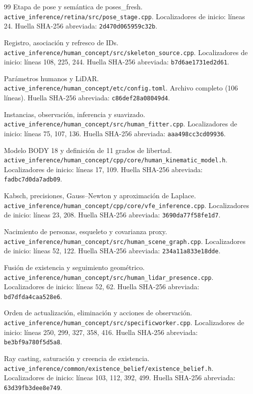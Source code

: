 \documentclass[11pt,a4paper]{article}
\newcommand{\code}[1]{\nolinkurl{#1}}
\newcommand{\file}[1]{\nolinkurl{#1}}
\begin{document}
\begin{thebibliography}{99}
 Etapa de pose y semántica de poses\_fresh.
\file{active_inference/retina/src/pose_stage.cpp}.
Localizadores de inicio: líneas 24. Huella SHA-256 abreviada: \code{2d470d065959c32b}.

 Registro, asociación y refresco de IDs.
\file{active_inference/human_concept/src/skeleton_source.cpp}.
Localizadores de inicio: líneas 108, 225, 244. Huella SHA-256 abreviada: \code{b7d6ae1731ed2d61}.

 Parámetros humanos y LiDAR.
\file{active_inference/human_concept/etc/config.toml}.
Archivo completo (106 líneas). Huella SHA-256 abreviada: \code{c86def28a08049d4}.

 Instancias, observación, inferencia y suavizado.
\file{active_inference/human_concept/src/human_fitter.cpp}.
Localizadores de inicio: líneas 75, 107, 136. Huella SHA-256 abreviada: \code{aaa498cc3cd09936}.

 Modelo BODY 18 y definición de 11 grados de libertad.
\file{active_inference/human_concept/cpp/core/human_kinematic_model.h}.
Localizadores de inicio: líneas 17, 109. Huella SHA-256 abreviada: \code{fadbc7d0da7adb09}.

 Kabsch, precisiones, Gauss--Newton y aproximación de Laplace.
\file{active_inference/human_concept/cpp/core/vfe_inference.cpp}.
Localizadores de inicio: líneas 23, 208. Huella SHA-256 abreviada: \code{3690da77f58fe1d7}.

 Nacimiento de personas, esqueleto y covarianza proxy.
\file{active_inference/human_concept/src/human_scene_graph.cpp}.
Localizadores de inicio: líneas 52, 122. Huella SHA-256 abreviada: \code{234a11a833e18dde}.

 Fusión de existencia y seguimiento geométrico.
\file{active_inference/human_concept/src/human_lidar_presence.cpp}.
Localizadores de inicio: líneas 52, 62. Huella SHA-256 abreviada: \code{bd7dfda4caa528e6}.

 Orden de actualización, eliminación y acciones de observación.
\file{active_inference/human_concept/src/specificworker.cpp}.
Localizadores de inicio: líneas 250, 299, 327, 358, 416. Huella SHA-256 abreviada: \code{be3bf9a780f5d5a8}.

 Ray casting, saturación y creencia de existencia.
\file{active_inference/common/existence_belief/existence_belief.h}.
Localizadores de inicio: líneas 103, 112, 392, 499. Huella SHA-256 abreviada: \code{63d39fb3dee8e749}.


\end{thebibliography}
\end{document}
